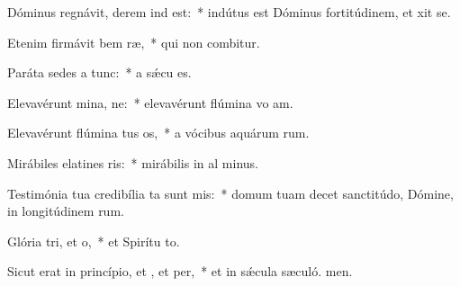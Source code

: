 \item Dóminus regnávit, derem ind est:~* indútus est Dóminus fortitúdinem, et xit se.
\item Etenim firmávit bem ræ,~* qui non combitur.
\item Paráta sedes a  tunc:~* a sǽcu  es.
\item Elevavérunt mina, ne:~* elevavérunt flúmina vo am.
\item Elevavérunt flúmina tus os,~* a vócibus aquárum rum.
\item Mirábiles elatines ris:~* mirábilis in al minus.
\item Testimónia tua credibília ta sunt mis:~* domum tuam decet sanctitúdo, Dómine, in longitúdinem rum.
\item Glória tri, et o,~* et Spirítu to.
\item Sicut erat in princípio, et , et per,~* et in sǽcula sæculó. men.
